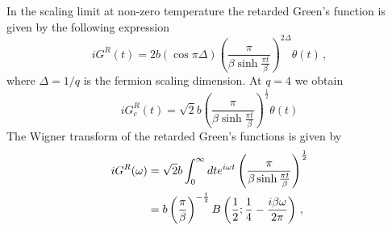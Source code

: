 \documentclass[prx,aps,onecolumn,amsfonts,showpacs,superscriptaddress,preprint,eqsecnum]
{revtex4-1}
\begin{document}
In the scaling limit at non-zero temperature the  retarded Green's function is 
given by the following expression
\begin{equation}
iG^{R}(t)=2b(\cos\pi\Delta)\left(\frac{\pi}{\beta\sinh\frac{\pi t}{\beta}}\right)^{2\Delta}\theta(t)\,,
\end{equation}
where $\Delta = 1/q$ is the fermion scaling dimension.
At $q=4$ we obtain 
\begin{equation}
iG^{R}_{c}(t)=\sqrt{2}b\left(\frac{\pi}{\beta\sinh\frac{\pi t}{\beta}}\right)^{\frac{1}{2}}\theta(t) \label{eq:retardedconformal}
\end{equation}
The Wigner transform of the retarded Green's functions is given by 
\begin{align}
	iG^{R}(\omega) &= \sqrt{2} b  \int_0^{\infty}dt e^{i\omega t} \left(\frac{\pi}{\beta\sinh\frac{\pi t}{\beta}}\right)^{\frac{1}{2}} \notag \\
	&= 
	b  \left(\frac{\pi}{\beta}\right)^{-\frac{1}{2}}  B\left( \frac{1}{2}; \frac{1}{4} -\frac{i \beta\omega}{2 \pi}\right)\,,
	\label{eq:retardedconformalfourier}
\end{align}
\end{document}
